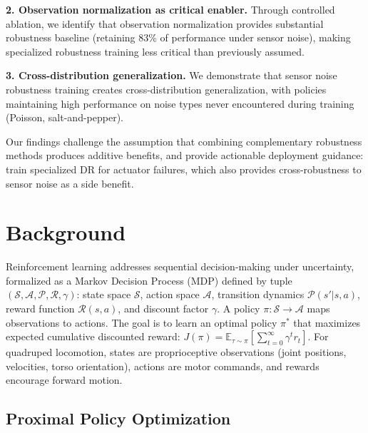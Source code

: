 \documentclass[conference]{IEEEtran}
\begin{document}
\textbf{2. Observation normalization as critical enabler.} Through controlled ablation, we identify that observation normalization provides substantial robustness baseline (retaining 83\% of performance under sensor noise), making specialized robustness training less critical than previously assumed.

\textbf{3. Cross-distribution generalization.} We demonstrate that sensor noise robustness training creates cross-distribution generalization, with policies maintaining high performance on noise types never encountered during training (Poisson, salt-and-pepper).

Our findings challenge the assumption that combining complementary robustness methods produces additive benefits, and provide actionable deployment guidance: train specialized DR for actuator failures, which also provides cross-robustness to sensor noise as a side benefit.

\section{Background}

Reinforcement learning addresses sequential decision-making under uncertainty, formalized as a Markov Decision Process (MDP) defined by tuple $(\mathcal{S}, \mathcal{A}, \mathcal{P}, \mathcal{R}, \gamma)$: state space $\mathcal{S}$, action space $\mathcal{A}$, transition dynamics $\mathcal{P}(s'|s,a)$, reward function $\mathcal{R}(s,a)$, and discount factor $\gamma$. A policy $\pi: \mathcal{S} \rightarrow \mathcal{A}$ maps observations to actions. The goal is to learn an optimal policy $\pi^*$ that maximizes expected cumulative discounted reward: $J(\pi) = \mathbb{E}_{\tau \sim \pi}[\sum_{t=0}^{\infty} \gamma^t r_t]$. For quadruped locomotion, states are proprioceptive observations (joint positions, velocities, torso orientation), actions are motor commands, and rewards encourage forward motion.

\subsection{Proximal Policy Optimization}
\end{document}
